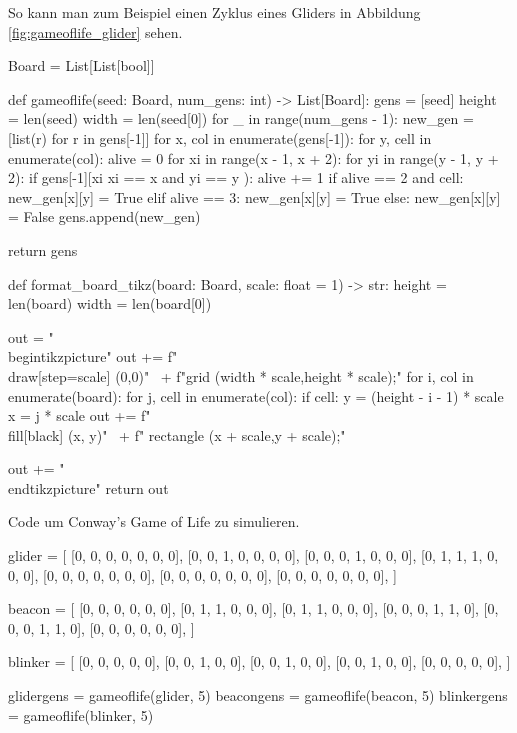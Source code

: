 \documentclass[11pt,a4paper]{article}
\begin{document}
%
So kann man zum Beispiel einen Zyklus eines Gliders in Abbildung \ref{fig:gameoflife_glider} sehen.
\begin{listing}
  \centering
  \begin{pyblock}
Board = List[List[bool]]

def gameoflife(seed: Board, num_gens: int) -> List[Board]:
    gens = [seed]
    height = len(seed)
    width = len(seed[0])
    for _ in range(num_gens - 1):
        new_gen = [list(r) for r in gens[-1]]
        for x, col in enumerate(gens[-1]):
            for y, cell in enumerate(col):
                alive = 0
                for xi in range(x - 1, x + 2):
                    for yi in range(y - 1, y + 2):
                        if gens[-1][xi %
                            xi == x and yi == y
                        ):
                            alive += 1
                if alive == 2 and cell:
                    new_gen[x][y] = True
                elif alive == 3:
                    new_gen[x][y] = True
                else:
                    new_gen[x][y] = False
        gens.append(new_gen)

    return gens


def format_board_tikz(board: Board, scale: float = 1) -> str:
    height = len(board)
    width = len(board[0])

    out = "\\begin{tikzpicture}\n"
    out += f"\\draw[step={scale}] (0,0)" \
           + f"grid ({width * scale},{height * scale});\n"
    for i, col in enumerate(board):
        for j, cell in enumerate(col):
            if cell:
                y = (height - i - 1) * scale
                x = j * scale
                out += f"\\fill[black] ({x}, {y})" \
                       + f" rectangle ({x + scale},{y + scale});\n"

    out += "\\end{tikzpicture}\n"
    return out
  \end{pyblock}
  \caption{Code um Conway's Game of Life zu simulieren.}
  \label{lst:gameoflife}
\end{listing}

\begin{pycode}
glider = [
    [0, 0, 0, 0, 0, 0, 0],
    [0, 0, 1, 0, 0, 0, 0],
    [0, 0, 0, 1, 0, 0, 0],
    [0, 1, 1, 1, 0, 0, 0],
    [0, 0, 0, 0, 0, 0, 0],
    [0, 0, 0, 0, 0, 0, 0],
    [0, 0, 0, 0, 0, 0, 0],
]

beacon = [
    [0, 0, 0, 0, 0, 0],
    [0, 1, 1, 0, 0, 0],
    [0, 1, 1, 0, 0, 0],
    [0, 0, 0, 1, 1, 0],
    [0, 0, 0, 1, 1, 0],
    [0, 0, 0, 0, 0, 0],
]

blinker = [
    [0, 0, 0, 0, 0],
    [0, 0, 1, 0, 0],
    [0, 0, 1, 0, 0],
    [0, 0, 1, 0, 0],
    [0, 0, 0, 0, 0],
]

glidergens = gameoflife(glider, 5)
beacongens = gameoflife(beacon, 5)
blinkergens = gameoflife(blinker, 5)
\end{pycode}
\end{document}
